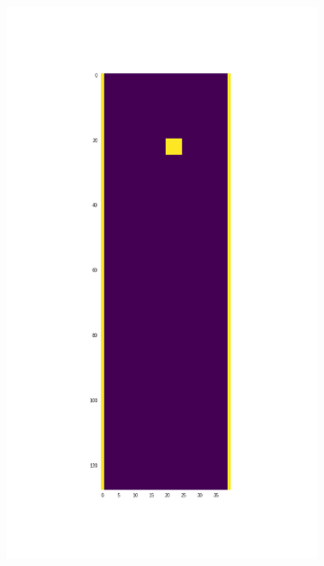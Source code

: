 \documentclass[]{article}
\begin{document}
\begin{figure}
	\centering
	\begin{subfigure}[b]{.49\textwidth}
		\centering
		\includegraphics[width=\linewidth]{figures/box_boundary.png}
		\caption{}
		\label{fig:box_boundary} 
	\end{subfigure}
	\begin{subfigure}[b]{0.49\textwidth}
		\centering

\end{subfigure}
\end{figure}
\end{document}
